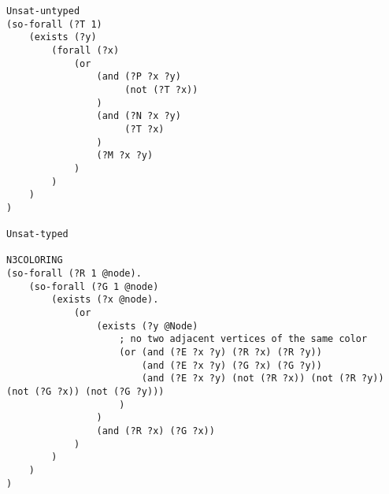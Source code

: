\begin{verbatim}
Unsat-untyped
(so-forall (?T 1)
    (exists (?y)
        (forall (?x)
            (or
                (and (?P ?x ?y)
                     (not (?T ?x))
                )
                (and (?N ?x ?y)
                     (?T ?x)
                )
				(?M ?x ?y)
            )
        )
    )
)

Unsat-typed

N3COLORING
(so-forall (?R 1 @node).
    (so-forall (?G 1 @node)
        (exists (?x @node).
            (or 
                (exists (?y @Node)
                    ; no two adjacent vertices of the same color
                    (or (and (?E ?x ?y) (?R ?x) (?R ?y))
                        (and (?E ?x ?y) (?G ?x) (?G ?y))
                        (and (?E ?x ?y) (not (?R ?x)) (not (?R ?y)) (not (?G ?x)) (not (?G ?y)))
                    )   
                )   
                (and (?R ?x) (?G ?x))
            )   
        )   
    )      
)
\end{verbatim}
